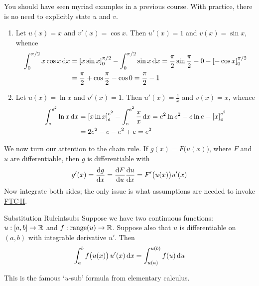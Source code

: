 \begin{examples}{}{}
You should have seen myriad examples in a previous course. With practice, there is no need to explicitly state $u$ and $v$.
\begin{enumerate}
  \item Let $u(x)=x$ and $v'(x)=\cos x$. Then $u'(x)=1$ and $v(x)=\sin x$, whence
	\begin{align*}
		\int_0^{\pi/2} x\cos x\,\dx &=\left[x\sin x\right]_0^{\pi/2} -\int_0^{\pi/2}\sin x\,\dx =\frac\pi 2\sin\frac{\pi}2-0-\left[-\cos x\right]_0^{\pi/2}\\
		&=\frac\pi 2+\cos\frac\pi 2-\cos 0=\frac\pi 2-1
	\end{align*}
	\item Let $u(x)=\ln x$ and $v'(x)=1$. Then $u'(x)=\frac 1x$ and $v(x)=x$, whence
	\begin{align*}
		\int_e^{e^2} \ln x\,\dx &=\left[x\ln x\right]_e^{e^2} -\int_e^{e^2}\frac xx\,\dx =e^2\ln e^2-e\ln e-\left[x\right]_e^{e^2}\\
		&=2e^2-e-e^2+e =e^2
	\end{align*}
\end{enumerate}
\end{examples}


We now turn our attention to the chain rule. If $g(x)=F\bigl(u(x)\bigr)$, where $F$ and $u$ are differentiable, then $g$ is differentiable with
\[g'(x)=\diff[g]{x}=\diff[F]{u}\diff[u]{x}=F'\bigl(u(x)\bigr) u'(x)\]
Now integrate both sides; the only issue is what assumptions are needed to invoke \hyperref[thm:ftc2]{FTC\,II}.

\begin{thm}{Substitution Rule}{intsubs}
Suppose we have two continuous functions: $u:[a,b]\to\R$ and $f:\range(u)\to\R$. Suppose also that $u$ is differentiable on $(a,b)$ with integrable derivative $u'$. Then
\[\int_a^bf\bigl(u(x)\bigr)\,u'(x)\,\dx=\int_{u(a)}^{u(b)}f(u)\,\du\]
\end{thm}

This is the famous `$u$-sub' formula from elementary calculus.

